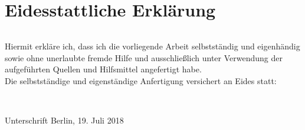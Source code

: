 \thispagestyle{empty}
\section*{Eidesstattliche Erklärung}
\begin{verbatim}

\end{verbatim}
Hiermit erkl\"{a}re ich, %
dass ich die vorliegende Arbeit %
selbstst\"{a}ndig und eigenh\"{a}ndig sowie ohne unerlaubte fremde Hilfe und ausschließlich unter Verwendung der aufgef\"{u}hrten Quellen und Hilfsmittel angefertigt habe. \\

Die selbstständige und eigenständige Anfertigung versichert an Eides statt:

\begin{verbatim}

\end{verbatim}
\hrulefill\\
\hspace*{2cm}Unterschrift
\hfill
Berlin, 19. Juli 2018
